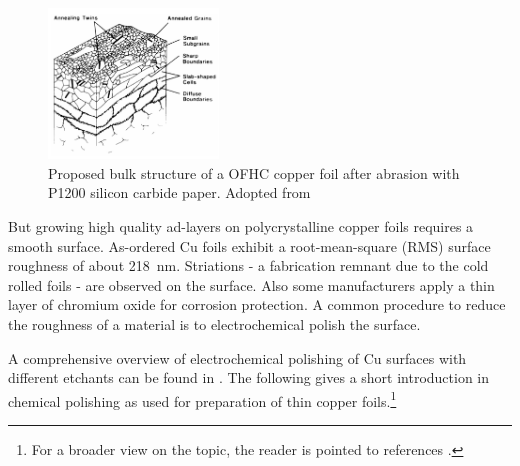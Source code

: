 

%	


\begin{figure}
	\includegraphics[height=40mm]{./images/grain-structure-copper-foil}
	\caption{Proposed bulk structure of a OFHC copper foil after abrasion with P1200 silicon carbide paper. Adopted from \cite{turley_nature_1981}}
	\label{fig:copper-foil-grains}
\end{figure}

But growing high quality ad-layers on polycrystalline copper foils requires a smooth surface. As-ordered Cu foils exhibit a root-mean-square (RMS) surface roughness of about \SI{218}{\nm}\cite{bin_zhang_low-temperature_2012}. Striations - a fabrication remnant due to the cold rolled foils - are observed on the surface\cite{kim_synthesis_2012-1}. Also some manufacturers apply a thin layer of chromium oxide for corrosion protection\cite{bin_zhang_low-temperature_2012}. A common procedure to reduce the roughness of a material is to electrochemical polish the surface.

A comprehensive overview of  electrochemical polishing of Cu surfaces with different etchants can be found in \cite{jinshan_electrochemical_2004}. The following gives a short introduction in chemical polishing as used for preparation of thin copper foils.\footnote{For a broader view on the topic, the reader is pointed to references \cite{antoine_polishing_1999, lilje_improved_2004, schulz_engeneering_2018}.}


